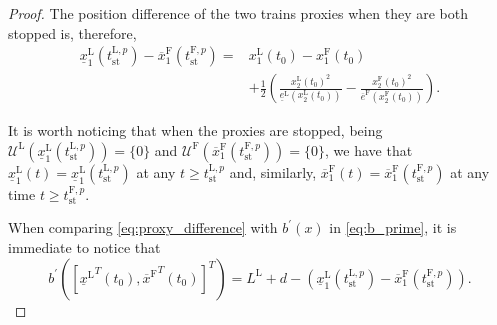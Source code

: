 \documentclass[letterpaper, 10 pt, conference]{ieeeconf}
\theoremstyle{definition}
\theoremstyle{nopoint}
\begin{document}
\begin{proof}
	
	The position difference of the two trains proxies when they are both stopped is, therefore, 
	\begin{equation}\label{eq:proxy_difference}
		\begin{aligned}
			\underline{x}_1^\mathrm{L}(t_{\mathrm{st}}^{\mathrm{L},p} ) - \overline{x}_1^{\mathrm{F}}(t_{\mathrm{st}}^{\mathrm{F},p}  )=&
			x_1^\mathrm{L}(t_0)-x_1^\mathrm{F}(t_0)\\
			&+\frac{1}{2}
			\left(\frac{{x_2^\mathrm{L}(t_0)}^2}{\underline{e}^\mathrm{L}\left(x_2^\mathrm{L}(t_0)\right)}
			-
			\frac{{x_2^\mathrm{F}(t_0)}^2}{\overline{e}^\mathrm{F}\left(x_2^\mathrm{F}(t_0)\right)}
			\right).
		\end{aligned}
	\end{equation}
	
	It is worth noticing that when the proxies are stopped, being $\mathcal{U}^\mathrm{L}(\underline{x}_1^\mathrm{L}(t_{\mathrm{st}}^{\mathrm{L},p} ))=\{0\}$ and $\mathcal{U}^\mathrm{F}(\overline{x}_1^\mathrm{F}(t_{\mathrm{st}}^{\mathrm{F},p}  ))=\{0\}$, we have that $\underline{x}_1^\mathrm{L}(t)=\underline{x}_1^\mathrm{L}(t_{\mathrm{st}}^{\mathrm{L},p} )$ at any $t\geq t_{\mathrm{st}}^{\mathrm{L},p}$ and, similarly, 
	$\overline{x}_1^\mathrm{F}(t)=\overline{x}_1^\mathrm{F}(t_{\mathrm{st}}^{\mathrm{F},p})$ at any time $t\geq t_{\mathrm{st}}^{\mathrm{F},p}$. 
	
	When comparing \eqref{eq:proxy_difference} with $b^\prime(x)$ in \eqref{eq:b_prime}, it is immediate to notice that 
	\begin{equation}\label{eq:equality_b_prime}
		b^\prime([{\underline{x}^\mathrm{L}}^T(t_0),{\overline{x}^\mathrm{F}}^T(t_0)]^T)=L^\mathrm{L}+d-\left(\underline{x}_1^\mathrm{L}(t_{\mathrm{st}}^{\mathrm{L},p} ) -\overline{x}_1^\mathrm{F}(t_{\mathrm{st}}^{\mathrm{F},p}  )\right).
	\end{equation}
	

\end{proof}
\end{document}
